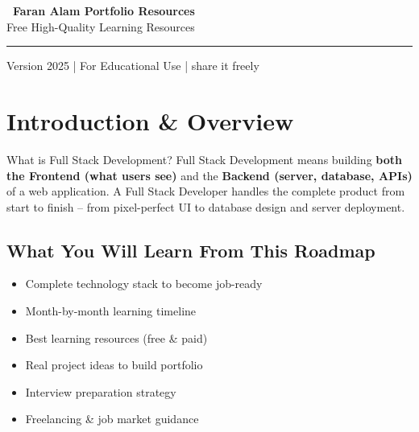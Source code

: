\documentclass[12pt,a4paper]{article}
\begin{document}
\begin{titlepage}
    \vspace{1.5cm}

    \begin{tcolorbox}[
        colback=FaranAccent!80,
        colframe=FaranAccent,
        width=0.55\textwidth,
        arc=20pt,
        boxrule=0pt,
        halign=center
    ]
        \centering\color{white}
        \textbf{\faStar~Faran Alam Portfolio Resources}\\
        {\small Free High-Quality Learning Resources}
    \end{tcolorbox}

    \vfill

    {\color{FaranBlue}\rule{\textwidth}{3pt}}
    {\small\color{FaranGray}Version 2025 | For Educational Use | share it freely}

\end{titlepage}
\pagecolor{white}
\color{DarkText}

\tableofcontents
\newpage

\section{Introduction \& Overview}

\begin{infobox}{What is Full Stack Development?}
Full Stack Development means building \textbf{both the Frontend (what users see)} and the \textbf{Backend (server, database, APIs)} of a web application. A Full Stack Developer handles the complete product from start to finish -- from pixel-perfect UI to database design and server deployment.
\end{infobox}

\vspace{0.5cm}

\subsection{What You Will Learn From This Roadmap}
\begin{itemize}[leftmargin=1.5em, itemsep=6pt]
    \item[\color{FaranAccent}\ding{52}] Complete technology stack to become job-ready
    \item[\color{FaranAccent}\ding{52}] Month-by-month learning timeline
    \item[\color{FaranAccent}\ding{52}] Best learning resources (free \& paid)
    \item[\color{FaranAccent}\ding{52}] Real project ideas to build portfolio
    \item[\color{FaranAccent}\ding{52}] Interview preparation strategy
    \item[\color{FaranAccent}\ding{52}] Freelancing \& job market guidance
\end{itemize}
\end{document}
